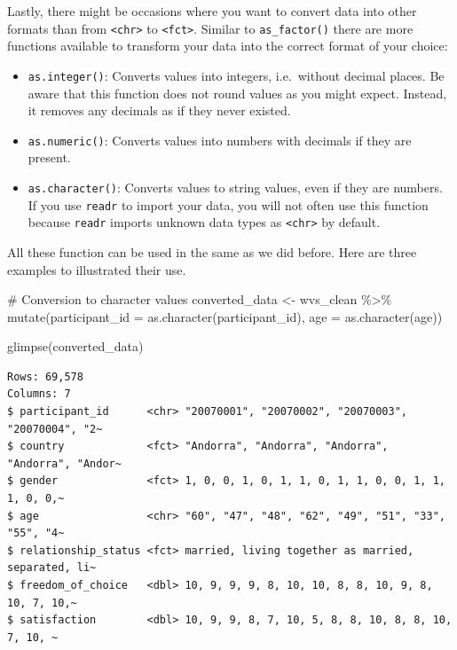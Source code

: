\documentclass[
  letterpaper,
]{krantz}
\makeatletter
\newenvironment{Shaded}{\begin{snugshade}}{\end{snugshade}}
\newcommand{\AttributeTok}[1]{\textcolor[rgb]{0.40,0.45,0.13}{#1}}
\newcommand{\CommentTok}[1]{\textcolor[rgb]{0.37,0.37,0.37}{#1}}
\newcommand{\FunctionTok}[1]{\textcolor[rgb]{0.28,0.35,0.67}{#1}}
\newcommand{\NormalTok}[1]{\textcolor[rgb]{0.00,0.23,0.31}{#1}}
\newcommand{\OtherTok}[1]{\textcolor[rgb]{0.00,0.23,0.31}{#1}}
\newcommand{\SpecialCharTok}[1]{\textcolor[rgb]{0.37,0.37,0.37}{#1}}
\newenvironment{kframe}{%
\medskip{}
\setlength{\fboxsep}{.8em}
 \def\at@end@of@kframe{}%
 \ifinner\ifhmode%
  \def\at@end@of@kframe{\end{minipage}}%
  \begin{minipage}{\columnwidth}%
 \fi\fi%
 \def\FrameCommand##1{\hskip\@totalleftmargin \hskip-\fboxsep
 \colorbox{shadecolor}{##1}\hskip-\fboxsep
     \hskip-\linewidth \hskip-\@totalleftmargin \hskip\columnwidth}%
 \MakeFramed {\advance\hsize-\width
   \@totalleftmargin\z@ \linewidth\hsize
   \@setminipage}}%
 {\par\unskip\endMakeFramed%
 \at@end@of@kframe}
\renewenvironment{Shaded}{\begin{kframe}}{\end{kframe}}
\makeatother
\begin{document}
Lastly, there might be occasions where you want to convert data into
other formats than from \texttt{\textless{}chr\textgreater{}} to
\texttt{\textless{}fct\textgreater{}}. Similar to \texttt{as\_factor()}
there are more functions available to transform your data into the
correct format of your choice:

\begin{itemize}
\item
  \texttt{as.integer()}: Converts values into integers, i.e.~without
  decimal places. Be aware that this function does not round values as
  you might expect. Instead, it removes any decimals as if they never
  existed.
\item
  \texttt{as.numeric()}: Converts values into numbers with decimals if
  they are present.
\item
  \texttt{as.character()}: Converts values to string values, even if
  they are numbers. If you use \texttt{readr} to import your data, you
  will not often use this function because \texttt{readr} imports
  unknown data types as \texttt{\textless{}chr\textgreater{}} by
  default.
\end{itemize}

All these function can be used in the same as we did before. Here are
three examples to illustrated their use.

\begin{Shaded}
\begin{Highlighting}[]
\CommentTok{\# Conversion to character values}
\NormalTok{converted\_data }\OtherTok{\textless{}{-}}
\NormalTok{  wvs\_clean }\SpecialCharTok{\%\textgreater{}\%}
  \FunctionTok{mutate}\NormalTok{(}\AttributeTok{participant\_id =} \FunctionTok{as.character}\NormalTok{(participant\_id),}
         \AttributeTok{age =} \FunctionTok{as.character}\NormalTok{(age))}

\FunctionTok{glimpse}\NormalTok{(converted\_data)}
\end{Highlighting}
\end{Shaded}

\begin{verbatim}
Rows: 69,578
Columns: 7
$ participant_id      <chr> "20070001", "20070002", "20070003", "20070004", "2~
$ country             <fct> "Andorra", "Andorra", "Andorra", "Andorra", "Andor~
$ gender              <fct> 1, 0, 0, 1, 0, 1, 1, 0, 1, 1, 0, 0, 1, 1, 1, 0, 0,~
$ age                 <chr> "60", "47", "48", "62", "49", "51", "33", "55", "4~
$ relationship_status <fct> married, living together as married, separated, li~
$ freedom_of_choice   <dbl> 10, 9, 9, 9, 8, 10, 10, 8, 8, 10, 9, 8, 10, 7, 10,~
$ satisfaction        <dbl> 10, 9, 9, 8, 7, 10, 5, 8, 8, 10, 8, 8, 10, 7, 10, ~
\end{verbatim}
\end{document}
